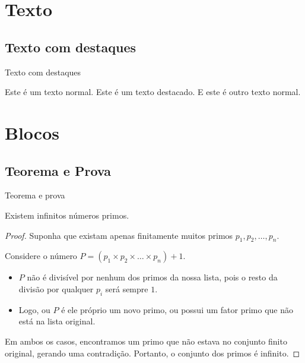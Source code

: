\documentclass[aspectratio=169]{beamer}
\begin{document}
\section{Texto}

\subsection{Texto com destaques}

\begin{frame}{Texto com destaques}
    
Este é um texto normal. \alert{Este é um texto destacado.} E este é outro texto normal.
\end{frame}

\section{Blocos}

\subsection{Teorema e Prova}

\begin{frame}{Teorema e prova}

\begin{theorem}
    Existem infinitos números primos.
  \end{theorem}

  \begin{proof}
    Suponha que existam apenas finitamente muitos primos $p_1, p_2, \dots, p_n$. 
    
    Considere o número $P = (p_1 \times p_2 \times \dots \times p_n) + 1$.
    
    \begin{itemize}
        \item $P$ não é divisível por nenhum dos primos da nossa lista, pois o resto da divisão por qualquer $p_i$ será sempre $1$.
        \item Logo, ou $P$ é ele próprio um novo primo, ou possui um fator primo que não está na lista original.
    \end{itemize}
    
    Em ambos os casos, encontramos um primo que não estava no conjunto finito original, gerando uma contradição. Portanto, o conjunto dos primos é infinito.
  \end{proof}
    
\end{frame}
\end{document}
